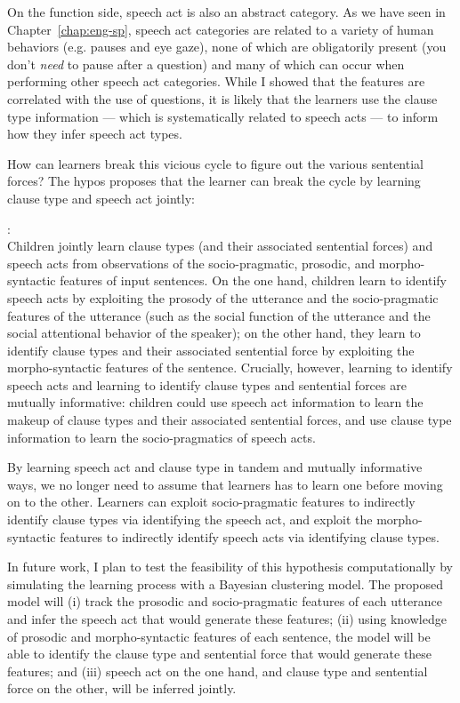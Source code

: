 On the function side, speech act is also an abstract category. As we have seen in Chapter~\ref{chap:eng-sp}, speech act categories are related to a variety of human behaviors (e.g. pauses and eye gaze), none of which are obligatorily present (you don't \emph{need} to pause after a question) and many of which can occur when performing other speech act categories. While I showed that the features are correlated with the use of questions, it is likely that the learners use the clause type information --- which is systematically related to speech acts --- to inform how they infer speech act types.


How can learners break this vicious cycle to figure out the various sentential forces? The hypos{} proposes that the learner can break the cycle by learning clause type and speech act jointly:

\begin{exe}\ex\label{ex:prag-syn-hypo}
:\\
Children jointly learn clause types (and their associated sentential forces) and speech acts from observations of the socio-pragmatic, prosodic, and morpho-syntactic features of input sentences. On the one hand, children learn to identify speech acts by exploiting the prosody of the utterance and the socio-pragmatic features of the utterance (such as the social function of the utterance and the social attentional behavior of the speaker); on the other hand, they learn to identify clause types and their associated sentential force by exploiting the morpho-syntactic features of the sentence. Crucially, however, learning to identify speech acts and learning to identify clause types and sentential forces are mutually informative: children could use speech act information to learn the makeup of clause types and their associated sentential forces, and use clause type information to learn the socio-pragmatics of speech acts.
\end{exe} 

By learning speech act and clause type in tandem and mutually informative ways, we no longer need to assume that learners has to learn one before moving on to the other. Learners can exploit socio-pragmatic features to indirectly identify clause types via identifying the speech act, and exploit the morpho-syntactic features to indirectly identify speech acts via identifying clause types.

In future work, I plan to test the feasibility of this hypothesis computationally by simulating the learning process with a Bayesian clustering model. The proposed model will (i) track the prosodic and socio-pragmatic features of each utterance and infer the speech act that would generate these features; (ii) using knowledge of prosodic and morpho-syntactic features of each sentence, the model will be able to identify the clause type and sentential force that would generate these features; and (iii) speech act on the one hand, and clause type and sentential force on the other, will be inferred jointly. 

